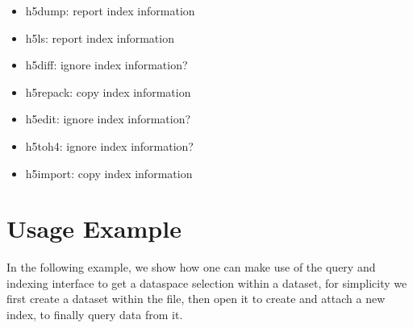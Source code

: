 \documentclass[letterpaper,hyper]{THG_RFC}
\begin{document}
\begin{itemize}
\item h5dump: report index information
\item h5ls: report index information
\item h5diff: ignore index information?
\item h5repack: copy index information
\item h5edit: ignore index information?
\item h5toh4: ignore index information?
\item h5import: copy index information
\end{itemize}

\section{Usage Example}

In the following example, we show how one can make use of the query and
indexing interface to get a dataspace selection within a dataset,
for simplicity we first create a dataset within the file, then open it to
create and attach a new index, to finally query data from it.
\end{document}
